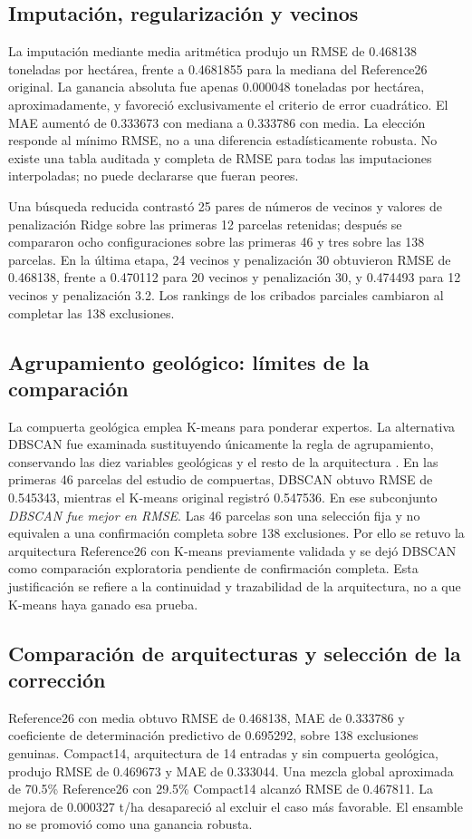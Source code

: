 \subsection*{Imputación, regularización y vecinos}
La imputación mediante media aritmética produjo un RMSE de 0.468138 toneladas por hectárea, frente a 0.4681855 para la mediana del Reference26 original. La ganancia absoluta fue apenas 0.000048 toneladas por hectárea, aproximadamente, y favoreció exclusivamente el criterio de error cuadrático. El MAE aumentó de 0.333673 con mediana a 0.333786 con media. La elección responde al mínimo RMSE, no a una diferencia estadísticamente robusta. No existe una tabla auditada y completa de RMSE para todas las imputaciones interpoladas; no puede declararse que fueran peores.

Una búsqueda reducida contrastó 25 pares de números de vecinos y valores de penalización Ridge sobre las primeras 12 parcelas retenidas; después se compararon ocho configuraciones sobre las primeras 46 y tres sobre las 138 parcelas. En la última etapa, 24 vecinos y penalización 30 obtuvieron RMSE de 0.468138, frente a 0.470112 para 20 vecinos y penalización 30, y 0.474493 para 12 vecinos y penalización 3.2. Los rankings de los cribados parciales cambiaron al completar las 138 exclusiones.

\subsection*{Agrupamiento geológico: límites de la comparación}
La compuerta geológica emplea K-means para ponderar expertos. La alternativa DBSCAN fue examinada sustituyendo únicamente la regla de agrupamiento, conservando las diez variables geológicas y el resto de la arquitectura \parencite{MacQueen1967,Ester1996DBSCAN}. En las primeras 46 parcelas del estudio de compuertas, DBSCAN obtuvo RMSE de 0.545343, mientras el K-means original registró 0.547536. En ese subconjunto \emph{DBSCAN fue mejor en RMSE}. Las 46 parcelas son una selección fija y no equivalen a una confirmación completa sobre 138 exclusiones. Por ello se retuvo la arquitectura Reference26 con K-means previamente validada y se dejó DBSCAN como comparación exploratoria pendiente de confirmación completa. Esta justificación se refiere a la continuidad y trazabilidad de la arquitectura, no a que K-means haya ganado esa prueba.

\subsection*{Comparación de arquitecturas y selección de la corrección}
Reference26 con media obtuvo RMSE de 0.468138, MAE de 0.333786 y coeficiente de determinación predictivo de 0.695292, sobre 138 exclusiones genuinas. Compact14, arquitectura de 14 entradas y sin compuerta geológica, produjo RMSE de 0.469673 y MAE de 0.333044. Una mezcla global aproximada de 70.5\% Reference26 con 29.5\% Compact14 alcanzó RMSE de 0.467811. La mejora de 0.000327 t/ha desapareció al excluir el caso más favorable. El ensamble no se promovió como una ganancia robusta.

